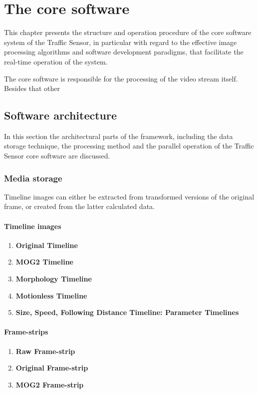\chapter{The core software}\label{chap:Core software}
This chapter presents the structure and operation procedure of the core software system of the Traffic Sensor, in particular with regard to the effective image processing algorithms and software development paradigms, that facilitate the real-time operation of the system.

The core software is responsible for the processing of the video stream itself.
Besides that other 
\section{Software architecture}
In this section the architectural parts of the framework, including the data storage technique, the processing method and the parallel operation of the Traffic Sensor core software are discussed.

\subsection{Media storage}
Timeline images can either be extracted from transformed versions of the original frame, or created from the latter calculated data.

\subsubsection{Timeline images}
\begin{enumerate}
	\item \textbf{Original Timeline}
	\item \textbf{MOG2 Timeline} 
	\item \textbf{Morphology Timeline}
	\item \textbf{Motionless Timeline}
	\item \textbf{Size, Speed, Following Distance Timeline: Parameter Timelines}
\end{enumerate}

\subsubsection{Frame-strips}
\begin{enumerate}
	\item \textbf{Raw Frame-strip}
	\item \textbf{Original Frame-strip}
	\item \textbf{MOG2 Frame-strip}
\end{enumerate}

